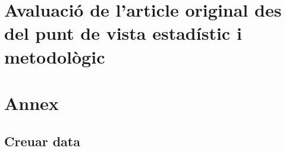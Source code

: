 \documentclass[
]{article}
\begin{document}
\section{Avaluació de l'article original des del punt de vista
estadístic i
metodològic}\label{avaluaciuxf3-de-larticle-original-des-del-punt-de-vista-estaduxedstic-i-metodoluxf2gic}

\clearpage
\appendix

\section{Annex}\label{annex}

\subsection{Creuar data}\label{creuar-data}

\label{anx:carrega}
\end{document}

